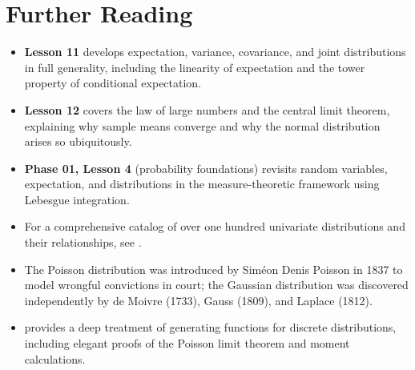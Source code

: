 \documentclass[11pt,a4paper]{article}
\begin{document}
\section{Further Reading}
\label{sec:further_reading}

\begin{itemize}
    \item \textbf{Lesson 11} develops expectation, variance, covariance,
    and joint distributions in full generality, including the linearity
    of expectation and the tower property of conditional expectation.
    \item \textbf{Lesson 12} covers the law of large numbers and the
    central limit theorem, explaining why sample means converge and why
    the normal distribution arises so ubiquitously.
    \item \textbf{Phase 01, Lesson 4} (probability foundations) revisits
    random variables, expectation, and distributions in the
    measure-theoretic framework using Lebesgue integration.
    \item For a comprehensive catalog of over one hundred univariate
    distributions and their relationships, see
    \citet[Appendix A]{blitzstein2019}.
    \item The Poisson distribution was introduced by Sim\'{e}on Denis
    Poisson in 1837 to model wrongful convictions in court; the Gaussian
    distribution was discovered independently by de Moivre (1733), Gauss
    (1809), and Laplace (1812).
    \item \citet[Chapter 4]{feller1968} provides a deep treatment of
    generating functions for discrete distributions, including elegant
    proofs of the Poisson limit theorem and moment calculations.
\end{itemize}


\end{document}
